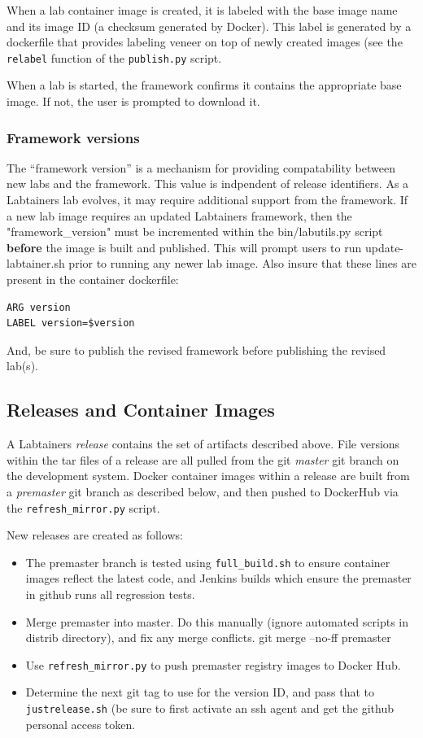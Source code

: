 \documentclass[12pt]{article}
\begin{document}
When a lab container image is created, it is labeled with the base image name and its image ID (a checksum generated by Docker).
This label is generated by a dockerfile that provides labeling veneer on top of newly created images (see the {\tt relabel} function
of the {\tt publish.py} script.

When a lab is started, the framework confirms it contains the appropriate base image.  If not, the user is prompted to download it.

\subsubsection{Framework versions}
The ``framework version'' is a mechanism for providing compatability between new labs and the framework.  This value is indpendent of
release identifiers. As a Labtainers lab evolves, it may require additional support from the framework.   If a new lab image requires
an updated Labtainers framework, then the "framework\_version" must be incremented within the
bin/labutils.py script \textbf{before} the image is built and published.  This will prompt users
to run update-labtainer.sh prior to running any newer lab image.
Also insure that these lines are present in the container dockerfile:
\begin{verbatim}
ARG version
LABEL version=$version
\end{verbatim}
\noindent And, be sure to publish the revised framework before publishing the revised lab(s).


\subsection{Releases and Container Images}
A Labtainers \textit{release} contains the set of artifacts described above.  File versions within the tar files
of a release are all pulled from the git \textit{master} git branch on the development system.  Docker container images within a release are built from a 
\textit{premaster} git branch as described below, and then pushed to DockerHub via the {\tt refresh\_mirror.py} script.

New releases are created as follows:
\begin{itemize}
\item The premaster branch is tested using {\tt full\_build.sh} to ensure container images reflect the latest code, and Jenkins builds which
ensure the premaster in github runs all regression tests.
\item Merge premaster into master.  Do this manually (ignore automated scripts in distrib directory), and fix any merge conflicts. {git merge --no-ff premaster}
\item Use {\tt refresh\_mirror.py} to push premaster registry images to Docker Hub.
\item Determine the next git tag to use for the version ID, and pass that to {\tt justrelease.sh} (be sure to first activate an
ssh agent and get the github personal access token.
\end{itemize}
\end{document}
